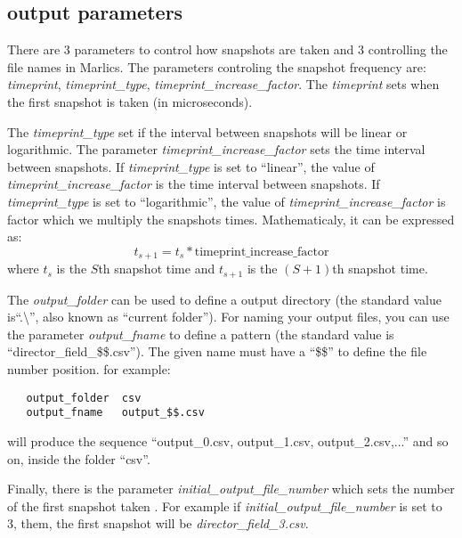 \documentclass{article}
\begin{document}
\subsection{output parameters}\label{snapshot.param}


There are 3 parameters to control how snapshots are taken and 3 controlling the file names in Marlics. The parameters controling the snapshot frequency are: \textit{timeprint}, \textit{timeprint_type}, \textit{timeprint_increase_factor}. The \textit{timeprint} sets when the first snapshot is taken (in microseconds). 

The \textit{timeprint_type} 
{set if the interval between snapshots will be linear or logarithmic.
The parameter \textit{timeprint_increase_factor} sets the time interval between snapshots.
If \textit{timeprint_type} is set to ``linear'', the value of \textit{timeprint_increase_factor} is the time interval between snapshots. If \textit{timeprint_type} is set to ``logarithmic'', the value of \textit{timeprint_increase_factor} is factor which we multiply the snapshots times. Mathematicaly, it can be expressed as:}
\begin{equation}
  t_{s+1}=t_s *\textrm{timeprint_increase_factor}
\end{equation}
where $t_s$ is the $S$th snapshot time and $t_{s+1}$ is the $(S+1)$th snapshot time.

The \textit{output\_folder} can be used to define a output directory (the standard value is``.\textbackslash'', also known as ``current folder'').
For naming your output files, you can use the parameter \textit{output\_fname} to define a pattern (the standard value is ``director\_field\_\$\$.csv'').
The given name must have a ``\$\$'' to define the file number position.
for example:
\begin{lstlisting}
   output_folder  csv
   output_fname   output_$$.csv
\end{lstlisting}
will produce the sequence ``output\_0.csv, output\_1.csv, output\_2.csv,...'' and so on, inside the folder ``csv''.  

Finally, there is the parameter \textit{initial_output_file_number} which sets the number of the first snapshot taken . For example if \textit{initial_output_file_number} is set to 3, them, the first snapshot will be \textit{director_field_3.csv}.
\end{document}
